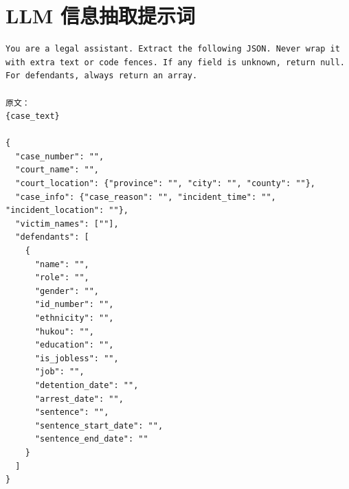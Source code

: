 \documentclass[a4paper,12pt]{report}
\begin{document}
\section{LLM 信息抽取提示词}
\label{app:llm_prompt}

\begin{Verbatim}[breaklines=true,breakanywhere=true,fontsize=\small]
You are a legal assistant. Extract the following JSON. Never wrap it with extra text or code fences. If any field is unknown, return null. For defendants, always return an array.

原文：
{case_text}

{
  "case_number": "",
  "court_name": "",
  "court_location": {"province": "", "city": "", "county": ""},
  "case_info": {"case_reason": "", "incident_time": "", "incident_location": ""},
  "victim_names": [""],
  "defendants": [
    {
      "name": "",
      "role": "",
      "gender": "",
      "id_number": "",
      "ethnicity": "",
      "hukou": "",
      "education": "",
      "is_jobless": "",
      "job": "",
      "detention_date": "",
      "arrest_date": "",
      "sentence": "",
      "sentence_start_date": "",
      "sentence_end_date": ""
    }
  ]
}
\end{Verbatim}
\end{document}
